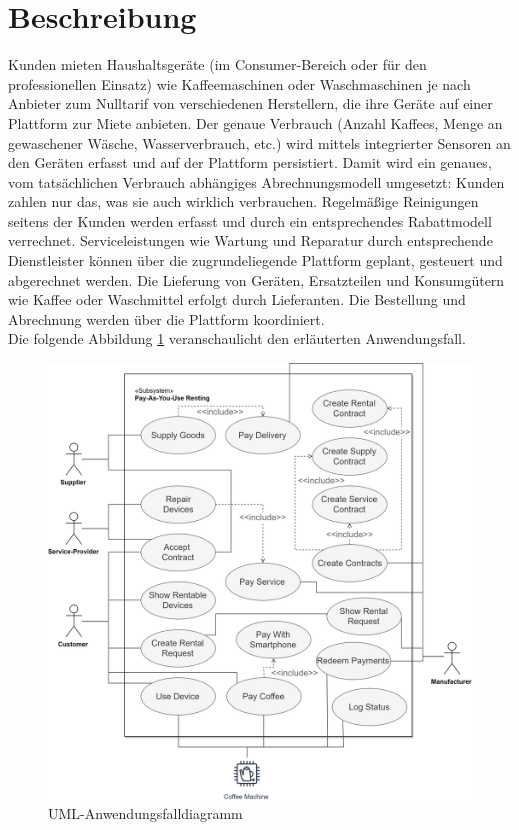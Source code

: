 \section{Beschreibung}
\label{sec:iot_usecase:description}
Kunden mieten Haushaltsgeräte (im Consumer-Bereich oder für den professionellen Einsatz) wie Kaffeemaschinen oder Waschmaschinen je nach Anbieter zum Nulltarif von verschiedenen Herstellern, die ihre Geräte auf einer Plattform zur Miete anbieten. Der genaue Verbrauch (Anzahl Kaffees, Menge an gewaschener Wäsche, Wasserverbrauch, etc.) wird mittels integrierter Sensoren an den Geräten erfasst und auf der Plattform persistiert. Damit wird ein genaues, vom tatsächlichen Verbrauch abhängiges Abrechnungsmodell umgesetzt: Kunden zahlen nur das, was sie auch wirklich verbrauchen. Regelmäßige Reinigungen seitens der Kunden werden erfasst und durch ein entsprechendes Rabattmodell verrechnet. Serviceleistungen wie Wartung und Reparatur durch entsprechende Dienstleister können über die zugrundeliegende Plattform geplant, gesteuert und abgerechnet werden. Die Lieferung von Geräten, Ersatzteilen und Konsumgütern wie Kaffee oder Waschmittel erfolgt durch Lieferanten. Die Bestellung und Abrechnung werden über die Plattform koordiniert.\\
Die folgende Abbildung \ref{fig:chapter04:usecase} veranschaulicht den erläuterten Anwendungsfall.



\begin{figure}[htbp]
 \centering
 \includegraphics[width=1.0\textwidth]{gfx/UML_Usecase.png}
 \caption{UML-Anwendungsfalldiagramm}
 \label{fig:chapter04:usecase}
\end{figure}


